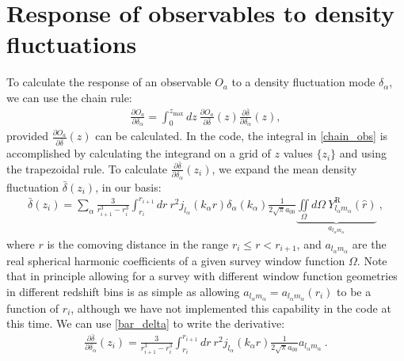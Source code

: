 \documentclass[a4paper,11pt]{article}
\newcommand{\sph}[2]{Y^\text{R}_{l_#1 m_#1}(\hat{#2})}
\begin{document}
\section{Response of observables to density fluctuations}
To calculate the response of an observable $O_a$ to a density fluctuation mode $\delta_\alpha$, we can use the chain rule:
\begin{align}\label{chain_obs}
\frac{\partial O_a}{\partial\delta_\alpha}=\int_0^{z_{\text{max}}}dz~\frac{\partial O_a}{\partial \bar{\delta}}(z)\frac{\partial \bar{\delta}}{\partial \delta_\alpha}(z),
\end{align}
provided $\frac{\partial{O_a}}{\partial \bar{\delta}}(z)$ can be calculated. In the code, the integral in \eqref{chain_obs} is accomplished by calculating the integrand on a grid of $z$ values $\{z_i\}$ and using the trapezoidal rule. To calculate $\frac{\partial\bar{\delta}}{\partial\delta_\alpha}(z_i)$, we expand the mean density fluctuation $\bar{\delta}(z_i)$, in our basis: 
\label{sec:density_fluct}
\begin{align}\label{bar_delta}
\bar{\delta}(z_i)= \displaystyle \sum_\alpha \frac{3}{r_{i+1}^3 - r_{i}^3} \int_{r_i}^ {r_{i+1} }dr ~ r^2 j_{l_\alpha}(k_\alpha r) \delta_\alpha(k_\alpha) \frac{1}{2\sqrt{\pi} a_{00}} \underbrace{ \iint\limits_\Omega d\Omega ~\sph{\alpha}{r}}_{a_{l_\alpha m_\alpha}} ~,
\end{align}
where $r$ is the comoving distance in the range $r_{i}\le r<r_{i+1}$, and $a_{l_\alpha m_\alpha}$ are the real spherical harmonic coefficients of a given survey window function $\Omega$. Note that in principle allowing for a survey with different window function geometries in different redshift bins is as simple as allowing  $a_{l_\alpha m_\alpha}=a_{l_\alpha m_\alpha}(r_i)$ to be a function of $r_i$, although we have not implemented this capability in the code at this time. We can use \eqref{bar_delta} to write the derivative:
\begin{align}
\frac{\partial \bar{\delta} }{ \partial \delta_\alpha}(z_i)=
\frac{3}{r_{i+1}^3 - r_{i}^3} \int_{r_{i}}^ {r_{i+1} }dr ~ r^2 j_{l_\alpha}(k_\alpha r)  \frac{1}{2\sqrt{\pi} a_{00}} a_{l_\alpha m_\alpha}~.
\end{align}
\end{document}
